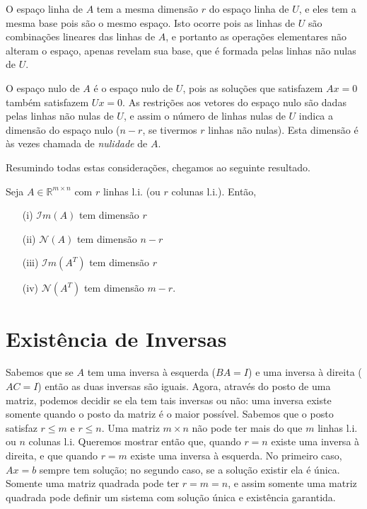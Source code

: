O espaço linha de $A$ tem a mesma dimensão $r$ do espaço linha de $U$, e eles tem a mesma base pois são o mesmo espaço. Isto ocorre pois as linhas de $U$ são combinações lineares das linhas de $A$, e portanto as operações elementares não alteram o espaço, apenas revelam sua base, que é formada pelas linhas não nulas de $U$.

O espaço nulo de $A$ é o espaço nulo de $U$, pois as soluções que satisfazem $Ax=0$ também satisfazem $Ux=0$. As restrições aos vetores do espaço nulo são dadas pelas linhas não nulas de $U$, e assim o número de linhas nulas de $U$ indica a dimensão do espaço nulo ($n-r$, se tivermos $r$ linhas não nulas). Esta dimensão é às vezes chamada de \emph{nulidade} de $A$.

Resumindo todas estas considerações, chegamos ao seguinte resultado.

\begin{teo}
  Seja $A\in {\mathbb{R}}^{m\times n}$ com $r$ linhas l.i. (ou $r$ colunas l.i.). Então,
  \begin{itemize}
  \item[(i)] ${\mathcal{I}}m(A)$ tem dimensão $r$
  \item[(ii)] ${\mathcal{N}}(A)$ tem dimensão $n-r$
  \item[(iii)] ${\mathcal{I}}m(A^T)$ tem dimensão $r$
  \item[(iv)] ${\mathcal{N}}(A^T)$ tem dimensão $m-r$.
  \end{itemize}
\end{teo}

\section{Existência de Inversas}

Sabemos que se $A$ tem uma inversa à esquerda ($BA=I$) e uma inversa à direita ($AC=I$) então as duas inversas são iguais. Agora, através do posto de uma matriz, podemos decidir se ela tem tais inversas ou não: uma inversa existe somente quando o posto da matriz é o maior possível. Sabemos que o posto satisfaz $r\leq m$ e $r\leq n$. Uma matriz $m\times n$ não pode ter mais do que $m$ linhas l.i. ou $n$ colunas l.i. Queremos mostrar então que, quando $r=n$ existe uma inversa à direita, e que quando $r=m$ existe uma inversa à esquerda. No primeiro caso, $Ax=b$ sempre tem solução; no segundo caso, se a solução existir ela é única. Somente uma matriz quadrada pode ter $r=m=n$, e assim somente uma matriz quadrada pode definir um sistema com solução única e existência garantida.

